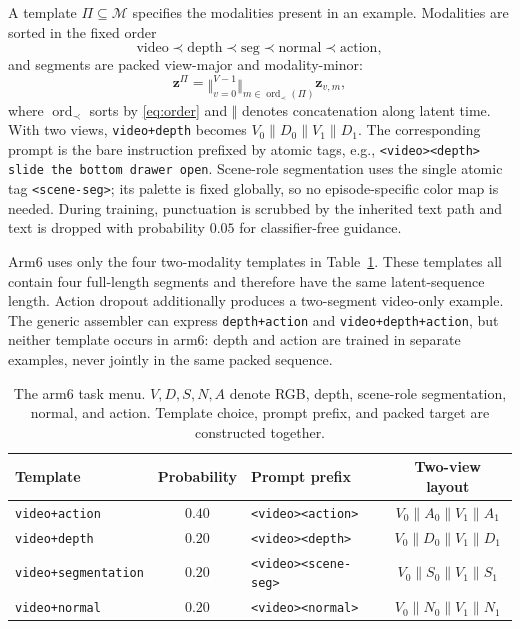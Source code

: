 \documentclass{article}
\newcommand{\code}[1]{\texttt{#1}}
\newcommand{\ptag}[1]{\texttt{<#1>}}
\newcommand{\tabref}[1]{Table~\ref{#1}}
\newcommand{\modalities}{\mathcal{M}}
\newcommand{\concat}{\mathbin{\|}}
\newcommand{\bigconcat}{\Vert}
\begin{document}
A template $\Pi\subseteq\modalities$ specifies the modalities present in an example. Modalities
are sorted in the fixed order
\begin{equation}
\mathrm{video}\prec\mathrm{depth}\prec\mathrm{seg}\prec\mathrm{normal}\prec\mathrm{action},
\label{eq:order}
\end{equation}
and segments are packed view-major and modality-minor:
\begin{equation}
 \mathbf{z}^{\Pi}=\mathop{\bigconcat}_{v=0}^{V-1}
 \mathop{\bigconcat}_{m\in\operatorname{ord}_{\prec}(\Pi)}\mathbf{z}_{v,m},
\label{eq:packing}
\end{equation}
where $\operatorname{ord}_{\prec}$ sorts by \eqref{eq:order} and $\bigconcat$ denotes
concatenation along latent time. With two views,
\code{video+depth} becomes $V_0\concat D_0\concat V_1\concat D_1$. The corresponding prompt is
the bare instruction prefixed by atomic tags, e.g.,
\code{<video><depth> slide the bottom drawer open}. Scene-role segmentation uses the single
atomic tag \ptag{scene-seg}; its palette is fixed globally, so no episode-specific color map is
needed. During training, punctuation is scrubbed by the inherited text path and text is dropped
with probability $0.05$ for classifier-free guidance.

Arm6 uses only the four two-modality templates in \tabref{tab:templates}. These templates all
contain four full-length segments and therefore have the same latent-sequence length. Action
dropout additionally produces a two-segment video-only example. The generic assembler can express
\code{depth+action} and \code{video+depth+action}, but neither template occurs in arm6: depth and
action are trained in separate examples, never jointly in the same packed sequence.

\begin{table}[t]
\caption{The arm6 task menu. $V,D,S,N,A$ denote RGB, depth, scene-role segmentation, normal,
and action. Template choice, prompt prefix, and packed target are constructed together.}
\label{tab:templates}
\centering
\small
\begin{tabular}{lclc}
\toprule
\textbf{Template} & \textbf{Probability} & \textbf{Prompt prefix} & \textbf{Two-view layout} \\
\midrule
\code{video+action}       & $0.40$ & \ptag{video}\ptag{action}    & $V_0\concat A_0\concat V_1\concat A_1$ \\
\code{video+depth}        & $0.20$ & \ptag{video}\ptag{depth}     & $V_0\concat D_0\concat V_1\concat D_1$ \\
\code{video+segmentation} & $0.20$ & \ptag{video}\ptag{scene-seg} & $V_0\concat S_0\concat V_1\concat S_1$ \\
\code{video+normal}       & $0.20$ & \ptag{video}\ptag{normal}    & $V_0\concat N_0\concat V_1\concat N_1$ \\
\bottomrule
\end{tabular}
\end{table}
\end{document}
